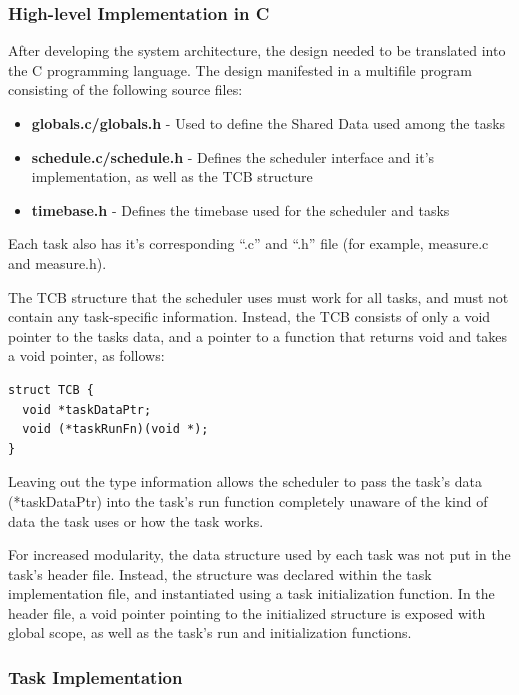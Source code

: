 \documentclass[12pt]{article} %
\begin{document}
\subsubsection{High-level Implementation in C}
After developing the system architecture, the design needed to be translated into the C programming language.  The design manifested in a multifile program consisting of the following source files:
\begin{itemize}
  \item \textbf{globals.c/globals.h} - Used to define the Shared Data used among the tasks
  \item \textbf{schedule.c/schedule.h} - Defines the scheduler interface and it's implementation, as well as the TCB structure
  \item \textbf{timebase.h} - Defines the timebase used for the scheduler and tasks
\end{itemize}
Each task also has it's corresponding ``.c'' and ``.h'' file (for example, measure.c and measure.h).

The TCB structure that the scheduler uses must work for all tasks, and must not
contain any task-specific information.  Instead, the TCB consists of only a void pointer to the tasks data, and a pointer to a function that returns void and takes a void pointer, as follows:
\begin{lstlisting}
struct TCB {
  void *taskDataPtr;
  void (*taskRunFn)(void *);
}
\end{lstlisting}
Leaving out the type information allows the scheduler to pass the task's data
(*taskDataPtr) into the task's run function completely unaware of the kind of
data the task uses or how the task works.

For increased modularity, the data structure used by each task was not put in
the task's header file.  Instead, the structure was declared within the task
implementation file, and instantiated using a task initialization function.  In
the header file, a void pointer pointing to the initialized structure is
exposed with global scope, as well as the task's run and initialization functions.

\subsubsection{Task Implementation}
\end{document}
